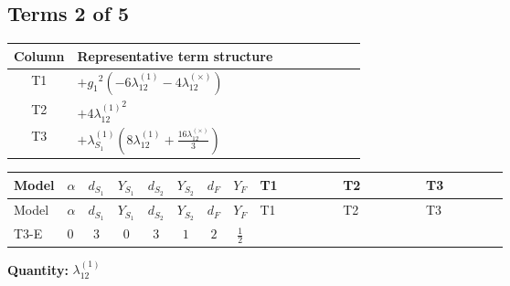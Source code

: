 \documentclass[8pt]{article}
\begin{document}
\begin{landscape}
\subsection*{Terms 2 of 5}
\begin{center}
\begin{tabular}{@{}c >{\raggedright\arraybackslash}p{0.82\linewidth}@{}}
\toprule
Column & Representative term structure \\
\midrule
T1 & \(\displaystyle +{g_1}^2 (-6 {\lambda_{12}^{(1)}}-4 {\lambda_{12}^{(\times)}})\) \\
\midrule
T2 & \(\displaystyle +4 {\lambda_{12}^{(1)}}^2\) \\
\midrule
T3 & \(\displaystyle +{\lambda_{S_1}^{(1)}} \left(8 {\lambda_{12}^{(1)}}+\frac{16 {\lambda_{12}^{(\times)}}}{3}\right)\) \\
\midrule
\bottomrule
\end{tabular}
\end{center}
\smallskip
\tiny
\begin{longtable}{@{}llcccccc >{\raggedright\arraybackslash}p{0.21\linewidth} >{\raggedright\arraybackslash}p{0.21\linewidth} >{\raggedright\arraybackslash}p{0.21\linewidth}@{}}
\toprule
Model & $\alpha$ & $d_{S_1}$ & $Y_{S_1}$ & $d_{S_2}$ & $Y_{S_2}$ & $d_F$ & $Y_F$ & T1 & T2 & T3 \\
\midrule
\endfirsthead
\toprule
Model & $\alpha$ & $d_{S_1}$ & $Y_{S_1}$ & $d_{S_2}$ & $Y_{S_2}$ & $d_F$ & $Y_F$ & T1 & T2 & T3 \\
\midrule
\endhead
T3-E & $0$ & $3$ & $0$ & $3$ & $1$ & $2$ & $\frac{1}{2}$ & \scriptsize\adjustbox{max width=\linewidth}{$\begin{gathered} +{g_1}^2 (-6 {\lambda_{12}^{(1)}}-4 {\lambda_{12}^{(\times)}})\end{gathered}$} & \scriptsize\adjustbox{max width=\linewidth}{$\begin{gathered} +4 {\lambda_{12}^{(1)}}^2\end{gathered}$} & \scriptsize\adjustbox{max width=\linewidth}{$\begin{gathered} +{\lambda_{S_1}^{(1)}} \left(8 {\lambda_{12}^{(1)}}+\frac{16 {\lambda_{12}^{(\times)}}}{3}\right)\end{gathered}$} \\
\midrule
\bottomrule
\end{longtable}
\clearpage
\noindent\textbf{Quantity: }$\lambda_{12}^{(1)}$\par\smallskip

\end{landscape}
\end{document}
